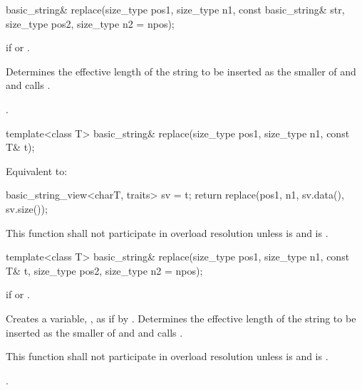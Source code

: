 %
\begin{itemdecl}
basic_string& replace(size_type pos1, size_type n1, const basic_string& str,
                      size_type pos2, size_type n2 = npos);
\end{itemdecl}

\begin{itemdescr}
\pnum
\throws
{}
if
or
.

\pnum
\effects
Determines the effective length  of the string to be inserted
as the smaller of  and  and calls
.

\pnum
\returns
{}.
\end{itemdescr}

%
\begin{itemdecl}
template<class T>
  basic_string& replace(size_type pos1, size_type n1, const T& t);
\end{itemdecl}

\begin{itemdescr}
\pnum
\effects
Equivalent to:
\begin{codeblock}
{
  basic_string_view<charT, traits> sv = t;
  return replace(pos1, n1, sv.data(), sv.size());
}
\end{codeblock}

\pnum
\remarks
This function shall not participate in overload resolution unless
 is  and
 is .
\end{itemdescr}

%
\begin{itemdecl}
template<class T>
  basic_string& replace(size_type pos1, size_type n1, const T& t,
                        size_type pos2, size_type n2 = npos);
\end{itemdecl}

\begin{itemdescr}
\pnum
\throws
{}
if
or
.

\pnum
\effects
Creates a variable, , as if by .
Determines the effective length  of the string to be inserted
as the smaller of  and 
and calls .

\pnum
\remarks
This function shall not participate in overload resolution
unless 
is  and  is .

\pnum
\returns
{}.
\end{itemdescr}

